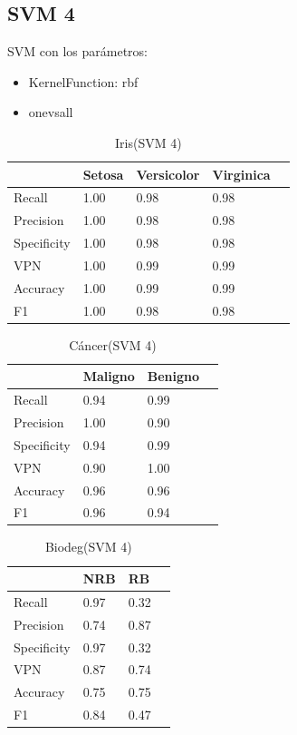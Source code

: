 \documentclass[a4paper,openwrite,12pt]{article}
\begin{document}
\subsection{SVM 4}
SVM con los parámetros:
\begin{itemize}
    \item KernelFunction: rbf
    \item onevsall
\end{itemize}

\begin{table}[H]
\centering
\begin{tabular}{@{}lllll@{}}
\toprule
            & Setosa & Versicolor & Virginica &  \\ \midrule
Recall      & 1.00   & 0.98       & 0.98      &  \\
Precision   & 1.00   & 0.98       & 0.98      &  \\
Specificity & 1.00   & 0.98       & 0.98      &  \\
VPN         & 1.00   & 0.99       & 0.99      &  \\
Accuracy    & 1.00   & 0.99       & 0.99      &  \\
F1          & 1.00   & 0.98       & 0.98      &  \\ \bottomrule
\end{tabular}
\caption{Iris(SVM 4)}
\end{table}


\begin{table}[H]
\centering
\begin{tabular}{@{}llll@{}}
\toprule
            & Maligno & Benigno &  \\ \midrule
Recall      & 0.94    & 0.99    &  \\
Precision   & 1.00    & 0.90    &  \\
Specificity & 0.94    & 0.99    &  \\
VPN         & 0.90    & 1.00    &  \\
Accuracy    & 0.96    & 0.96    &  \\
F1          & 0.96    & 0.94    &  \\ \bottomrule
\end{tabular}
\caption{Cáncer(SVM 4)}
\end{table}


\begin{table}[H]
\centering
\begin{tabular}{@{}llll@{}}
\toprule
            & NRB &   RB &  \\ \midrule
Recall      & 0.97    & 0.32    &  \\
Precision   & 0.74    & 0.87    &  \\
Specificity & 0.97    & 0.32    &  \\
VPN         & 0.87    & 0.74    &  \\
Accuracy    & 0.75    & 0.75    &  \\
F1          & 0.84    & 0.47    &  \\ \bottomrule
\end{tabular}
\caption{Biodeg(SVM 4)}
\end{table}
\end{document}
